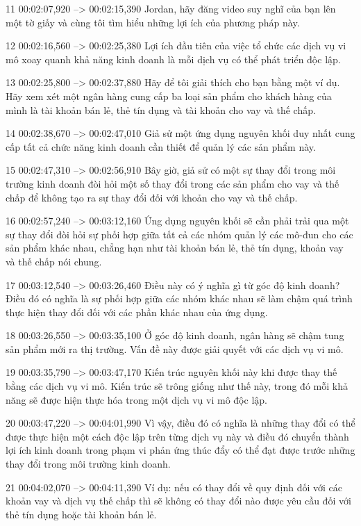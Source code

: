 11
00:02:07,920 --> 00:02:15,390
Jordan, hãy đăng video suy nghĩ của bạn lên một tờ giấy và cùng tôi tìm hiểu những lợi ích của phương pháp này.

12
00:02:16,560 --> 00:02:25,380
Lợi ích đầu tiên của việc tổ chức các dịch vụ vi mô xoay quanh khả năng kinh doanh là mỗi dịch vụ có thể phát triển độc lập.

13
00:02:25,800 --> 00:02:37,880
Hãy để tôi giải thích cho bạn bằng một ví dụ.  Hãy xem xét một ngân hàng cung cấp ba loại sản phẩm cho khách hàng của mình là tài khoản bán lẻ, thẻ tín dụng và tài khoản cho vay và thế chấp.

14
00:02:38,670 --> 00:02:47,010
Giả sử một ứng dụng nguyên khối duy nhất cung cấp tất cả chức năng kinh doanh cần thiết để quản lý các sản phẩm này.

15
00:02:47,310 --> 00:02:56,910
Bây giờ, giả sử có một sự thay đổi trong môi trường kinh doanh đòi hỏi một số thay đổi trong các sản phẩm cho vay và thế chấp để không tạo ra sự thay đổi đối với khoản cho vay và thế chấp.

16
00:02:57,240 --> 00:03:12,160
Ứng dụng nguyên khối sẽ cần phải trải qua một sự thay đổi đòi hỏi sự phối hợp giữa tất cả các nhóm quản lý các mô-đun cho các sản phẩm khác nhau, chẳng hạn như tài khoản bán lẻ, thẻ tín dụng, khoản vay và thế chấp nói chung.

17
00:03:12,540 --> 00:03:26,460
Điều này có ý nghĩa gì từ góc độ kinh doanh?  Điều đó có nghĩa là sự phối hợp giữa các nhóm khác nhau sẽ làm chậm quá trình thực hiện thay đổi đối với các phần khác nhau của ứng dụng.

18
00:03:26,550 --> 00:03:35,100
Ở góc độ kinh doanh, ngân hàng sẽ chậm tung sản phẩm mới ra thị trường.  Vấn đề này được giải quyết với các dịch vụ vi mô.

19
00:03:35,790 --> 00:03:47,170
Kiến trúc nguyên khối này khi được thay thế bằng các dịch vụ vi mô.  Kiến trúc sẽ trông giống như thế này, trong đó mỗi khả năng sẽ được hiện thực hóa trong một dịch vụ vi mô độc lập.

20
00:03:47,220 --> 00:04:01,990
Vì vậy, điều đó có nghĩa là những thay đổi có thể được thực hiện một cách độc lập trên từng dịch vụ này và điều đó chuyển thành lợi ích kinh doanh trong phạm vi phản ứng thúc đẩy có thể đạt được trước những thay đổi trong môi trường kinh doanh.

21
00:04:02,070 --> 00:04:11,390
Ví dụ: nếu có thay đổi về quy định đối với các khoản vay và dịch vụ thế chấp thì sẽ không có thay đổi nào được yêu cầu đối với thẻ tín dụng hoặc tài khoản bán lẻ.


